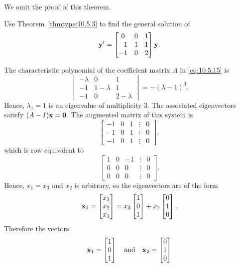 \documentclass{ximera}
\begin{document}
We omit the proof of this theorem.

\begin{example}\label{example:10.5.5}
Use Theorem~\ref{thmtype:10.5.3} to find the general solution of
\begin{equation}\label{eq:10.5.15}
{\bf y}'=\begin{bmatrix}0&0&1\\-1&1&1\\-1&0&2\end{bmatrix}{\bf y}.
\end{equation}


\begin{explanation}  The characteristic polynomial of
the coefficient matrix $A$ in  \eqref{eq:10.5.15} is
$$
\begin{vmatrix}-\lambda & 0 & 1\\ -1 & 1-\lambda &
1\\ -1 & 0 & 2-\lambda\end{vmatrix}=-(\lambda-1)^3.
$$
Hence,  $\lambda_1=1$ is
an eigenvalue of multiplicity $3$.  The associated eigenvectors
satisfy $(A-I){\bf x=0}$. The  augmented
matrix of this system is
$$
\begin{bmatrix} -1 & 0 & 1 &\vdots & 0\\
-1& 0 & 1 &\vdots & 0\\ -1 & 0 & 1 &
\vdots & 0\end{bmatrix},
 $$
which is row equivalent to
$$
\begin{bmatrix} 1 & 0 &- 1 &\vdots& 0\\ 0 & 0 & 0  &\vdots& 0
\\ 0 & 0 & 0 &\vdots&0\end{bmatrix}.
$$
Hence, $x_1 =x_3$ and  $x_2$ is arbitrary, so the eigenvectors are  of
the form
$$
{\bf x}_1=\begin{bmatrix}x_3\\x_2\\x_3\end{bmatrix}=x_3\begin{bmatrix}1\\0\\1\end{bmatrix}+x_2\begin{bmatrix}0\\1\\0\end{bmatrix}.
$$
Therefore the vectors
\begin{equation}\label{eq:10.5.16}
{\bf x}_1  =\begin{bmatrix}1\\0\\1\end{bmatrix}\quad\mbox{and}\quad {\bf x}_2=\begin{bmatrix}0\\1\\0\end{bmatrix}

\end{equation}
\end{explanation}
\end{example}
\end{document}
